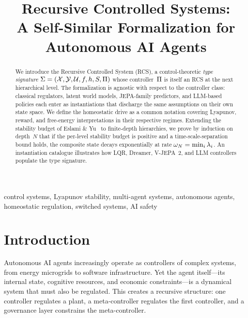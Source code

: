\documentclass[conference]{IEEEtran}
\title{Recursive Controlled Systems:\\
A Self-Similar Formalization for\\Autonomous AI Agents}
\author{
  \IEEEauthorblockN{Carlos D. Escobar-Valbuena}
  \IEEEauthorblockA{
    Broomva Research\\
    Bogot\'a, Colombia\\
    carlosdavidescobar@gmail.com
  }
}
\begin{document}
\maketitle

\begin{abstract}
We introduce the Recursive Controlled System (RCS), a control-theoretic
\emph{type signature} $\Sigma = (\mathcal{X}, \mathcal{Y}, \mathcal{U}, f, h, S, \Pi)$
whose controller~$\Pi$ is itself an RCS at the next hierarchical
level.  The formalization is agnostic with respect to the controller
class: classical regulators, latent world models, JEPA-family
predictors, and LLM-based policies each enter as instantiations that
discharge the same assumptions on their own state space.  We define the
homeostatic drive as a common notation covering Lyapunov, reward, and
free-energy interpretations in their respective regimes.  Extending the
stability budget of Eslami \& Yu~\cite{eslami2026control} to
finite-depth hierarchies, we prove by induction on depth~$N$ that if
the per-level stability budget is positive and a time-scale-separation
bound holds, the composite state decays exponentially at rate
$\omega_N = \min_i \lambda_i$.  An instantiation catalogue illustrates
how LQR, Dreamer, V-JEPA~2, and LLM controllers populate the type
signature.
\end{abstract}

\begin{IEEEkeywords}
  control systems, Lyapunov stability, multi-agent systems, autonomous agents,
  homeostatic regulation, switched systems, AI safety
\end{IEEEkeywords}

\section{Introduction}

Autonomous AI agents increasingly operate as controllers of complex
systems, from energy microgrids to software infrastructure.  Yet the
agent itself---its internal state, cognitive resources, and economic
constraints---is a dynamical system that must also be regulated.  This
creates a recursive structure: one controller regulates a plant, a
meta-controller regulates the first controller, and a governance layer
constrains the meta-controller.
\end{document}
